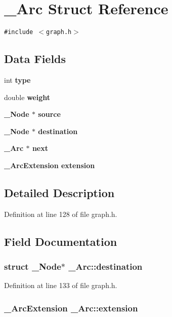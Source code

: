 \section{\_\-Arc Struct Reference}
\label{struct__Arc}
{\tt \#include $<$graph.h$>$}

\subsection*{Data Fields}
\begin{CompactItemize}
\item 
int \bf{type}
\item 
double \bf{weight}
\item 
\bf{\_\-Node} $\ast$ \bf{source}
\item 
\bf{\_\-Node} $\ast$ \bf{destination}
\item 
\bf{\_\-Arc} $\ast$ \bf{next}
\item 
\bf{\_\-Arc\-Extension} \bf{extension}
\end{CompactItemize}


\subsection{Detailed Description}




Definition at line 128 of file graph.h.

\subsection{Field Documentation}
\subsubsection{\setlength{\rightskip}{0pt plus 5cm}struct \bf{\_\-Node}$\ast$ \bf{\_\-Arc::destination}}\label{struct__Arc_e8e2630ecdf74e27af5b04e9e10bbcc7}




Definition at line 133 of file graph.h.
\subsubsection{\setlength{\rightskip}{0pt plus 5cm}\bf{\_\-Arc\-Extension} \bf{\_\-Arc::extension}}\label{struct__Arc_f252124a3e85dc17c07219d0c6144676}




